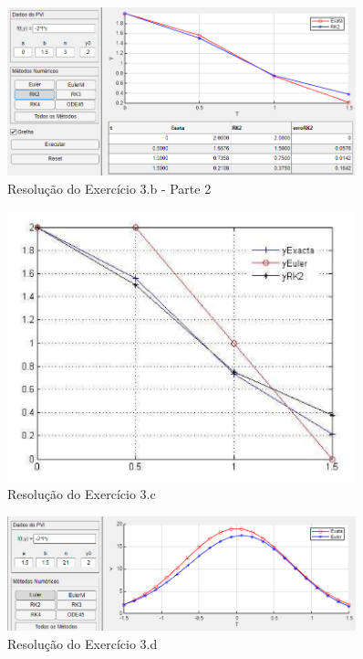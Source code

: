 \begin{figure}[H]
    \centering
    \includegraphics[width=0.9\textwidth]{Fotos/1farol3b2}
    \caption{Resolução do Exercício 3.b - Parte 2}
    \label{fig:1farol3b2}
\end{figure}

\begin{figure}[H]
    \centering
    \includegraphics[width=0.9\textwidth]{Fotos/1farol3c}
    \caption{Resolução do Exercício 3.c}
    \label{fig:1farol3c}
\end{figure}

\begin{figure}[H]
    \centering
    \includegraphics[width=0.9\textwidth]{Fotos/1farol3d}
    \caption{Resolução do Exercício 3.d}
    \label{fig:1farol3d}
\end{figure}

